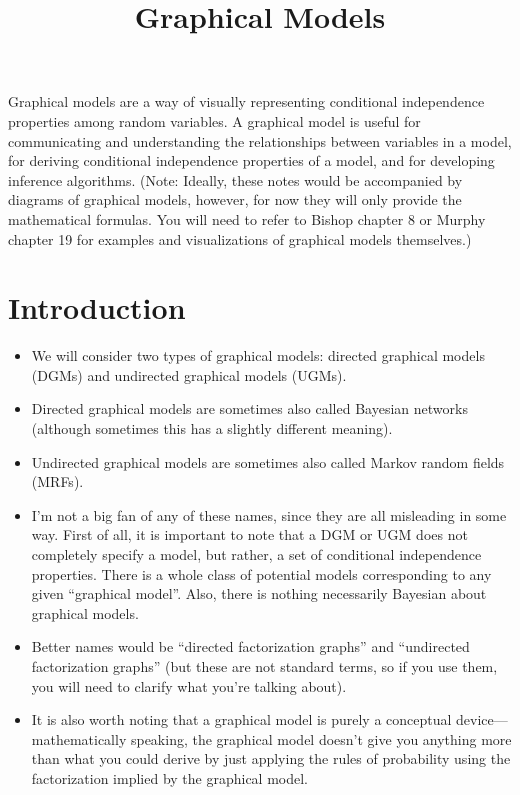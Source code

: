 \documentclass[12pt]{article}
\title{Graphical Models}
\author{}
\date{}
\begin{document}
\maketitle

\tableofcontents
\thispagestyle{firststyle}


\vspace{2em}

Graphical models are a way of visually representing conditional independence properties among random variables. A graphical model is useful for communicating and understanding the relationships between variables in a model, for deriving conditional independence properties of a model, and for developing inference algorithms. (Note: Ideally, these notes would be accompanied by diagrams of graphical models, however, for now they will only provide the mathematical formulas. You will need to refer to Bishop chapter 8 or Murphy chapter 19 for examples and visualizations of graphical models themselves.)

\newpage

\section{Introduction}

\begin{itemize}
\item We will consider two types of graphical models: directed graphical models (DGMs) and undirected graphical models (UGMs).
\item Directed graphical models are sometimes also called Bayesian networks (although sometimes this has a slightly different meaning).
\item Undirected graphical models are sometimes also called Markov random fields (MRFs).
\item I'm not a big fan of any of these names, since they are all misleading in some way. First of all, it is important to note that a DGM or UGM does not completely specify a model, but rather, a set of conditional independence properties. There is a whole class of potential models corresponding to any given ``graphical model''. Also, there is nothing necessarily Bayesian about graphical models.
\item Better names would be ``directed factorization graphs'' and ``undirected factorization graphs'' (but these are not standard terms, so if you use them, you will need to clarify what you're talking about).
\item It is also worth noting that a graphical model is purely a conceptual device---mathematically speaking, the graphical model doesn't give you anything more than what you could derive by just applying the rules of probability using the factorization implied by the graphical model.
\end{itemize}
\end{document}
